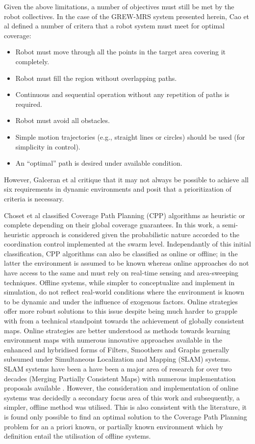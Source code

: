 \documentclass{report}
\begin{document}
Given the above limitations, a number of objectives must still be met by the robot collectives. In the case of the GREW-MRS system presented herein, Cao et al \cite{Cao1988} defined a number of critera that a robot system must meet for optimal coverage:
\begin{itemize}
	\item Robot must move through all the points in the target area covering it completely.
	\item Robot must fill the region without overlapping paths.
	\item Continuous and sequential operation without any repetition of paths is required.
	\item Robot must avoid all obstacles.
	\item Simple motion trajectories (e.g., straight lines or circles) should be used (for simplicity in control).
	\item An “optimal” path is desired under available condition.
\end{itemize}

However, Galceran et al \cite{Galceran2013} critique that it may not always be possible to achieve all six requirements in dynamic environments and posit that a prioritization of criteria is necessary.

Choset et al \cite{Choset2001} classified Coverage Path Planning (CPP) algorithms as heuristic or complete depending on their global coverage guarantees. In this work, a semi-heuristic approach is considered given the probabilistic nature accorded to the coordination control implemented at the swarm level. Independantly of this initial classification, CPP algorithms can also be classified as online or offline; in the latter the environment is assumed to be known whereas online approaches do not have access to the same and must rely on real-time sensing and area-sweeping techniques. Offline systems, while simpler to conceptualize and implement in simulation, do not reflect real-world conditions where the environment is known to be dynamic and under the influence of exogenous factors. Online strategies offer more robust solutions to this issue despite being much harder to grapple with from a technical standpoint towards the achievement of globally consistent maps. Online strategies are better understood as methods towards learning environment maps with numerous innovative approaches available in the enhanced and hybridised forms of Filters, Smoothers and Graphs generally subsumed under Simultaneous Localization and Mapping (SLAM) systems. SLAM systems have been a have been a major area of research for over two decades (Merging Partially Consistent Maps) with numerous implementation proposals available \cite{Lu1997} \cite{Grisetti2007} \cite{Montemerlo2002} \cite{Olson2006} \cite{Smith1987} \cite{Thrun2004}. However, the consideration and implementation of online systems was decidedly a secondary focus area of this work and subsequently, a simpler, offline method was utilised. This is also consistent with the literature, it is found only possible to find an optimal solution to the Coverage Path Planning problem for an a priori known, or partially known environment \cite{Galceran2013} which by definition entail the utilisation of offline systems.
\end{document}

